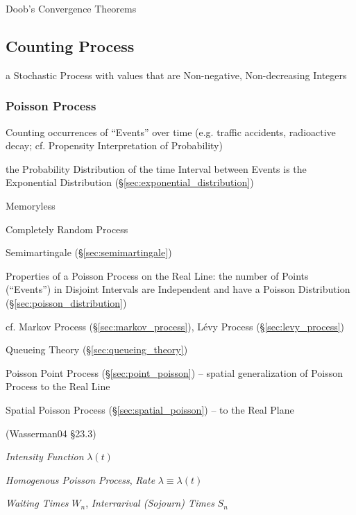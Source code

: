 Doob's Convergence Theorems



\subsection{Counting Process}\label{sec:counting_process}

a Stochastic Process with values that are Non-negative, Non-decreasing Integers



\subsubsection{Poisson Process}\label{sec:poisson_process}

Counting occurrences of ``Events'' over time (e.g. traffic accidents,
radioactive decay; cf. Propensity Interpretation of Probability)

the Probability Distribution of the time Interval between Events is the
Exponential Distribution (\S\ref{sec:exponential_distribution})

Memoryless

Completely Random Process

Semimartingale (\S\ref{sec:semimartingale})

Properties of a Poisson Process on the Real Line: the number of Points
(``Events'') in Disjoint Intervals are Independent and have a Poisson
Distribution (\S\ref{sec:poisson_distribution})

cf. Markov Process (\S\ref{sec:markov_process}), L\'evy Process
(\S\ref{sec:levy_process})

Queueing Theory (\S\ref{sec:queueing_theory})

Poisson Point Process (\S\ref{sec:point_poisson}) -- spatial generalization of
Poisson Process to the Real Line

Spatial Poisson Process (\S\ref{sec:spatial_poisson}) -- to the Real Plane

(Wasserman04 \S 23.3)

\emph{Intensity Function} $\lambda(t)$

\emph{Homogenous Poisson Process}, \emph{Rate} $\lambda \equiv \lambda(t)$

\emph{Waiting Times} $W_n$, \emph{Interrarival (Sojourn) Times} $S_n$

